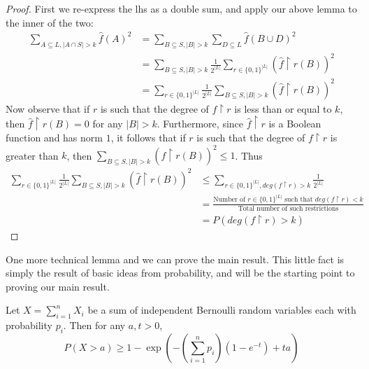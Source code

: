 \begin{proof}
	First we re-express the lhs as a double sum, and apply our above lemma to the inner of the two: 
	\begin{align*}
		\sum_{A \subseteq L, |A \cap S| > k} \hat{f}(A)^2 &= \sum_{B \subseteq S, |B| > k} \sum_{D \subseteq L} \hat{f}(B\cup D)^2 \\
		&= \sum_{B \subseteq S, |B| > k} \frac{1}{2^{|L|}} \sum_{r \in \{0,1\}^{|L|}} \left( \hat{f} \restriction r(B) \right)^2 \\
		&= \sum_{r \in \{0,1\}^{|L|}} \frac{1}{2^{|L|}} \sum_{B \subseteq S, |B| > k} \left( \hat{f}\restriction r(B) \right)^2
	\end{align*}
	Now observe that if $r$ is such that the degree of $f \restriction r$ is less than or equal to $k$, then $\hat{f} \restriction r (B) = 0$ for any $|B| > k$. Furthermore, since $\hat{f} \restriction r$ is a Boolean function and has norm $1$, it follows that if $r$ is such that the degree of $f \restriction r$ is greater than $k$, then $\sum_{B \subseteq S, |B| > k} \left(\hat{f} \restriction r(B)\right)^2 \leq 1$. Thus  
	\begin{align}
		\sum_{r \in \{0,1\}^{|L|}} \frac{1}{2^{|L|}} \sum_{B \subseteq S, |B| > k} \left( \hat{f}\restriction r(B) \right)^2 &\leq \sum_{r \in \{0,1\}^{|L|}, deg(f\restriction r) > k} \frac{1}{2^{|L|}}  \\
		&= \frac{\textrm{Number of $r \in \{0,1\}^{|L|}$ such that $deg(f \restriction r) < k$}}{\textrm{Total number of such restrictions}} \\
		&= P(deg(f \restriction r) > k)
	\end{align} 
\end{proof}
One more technical lemma and we can prove the main result. This little fact is simply the result of basic ideas from probability, and will be the starting point to proving our main result. 
\begin{lemma}
	Let $X = \sum_{i=1}^n X_i$ be a sum of independent Bernoulli random variables each with probability $p_i$. Then for any $a,t > 0$, 
	\[ P(X > a) \geq 1-\exp\left(-\left(\sum_{i=1}^n p_i \right)(1-e^{-t})+ta\right) \]
\end{lemma}
